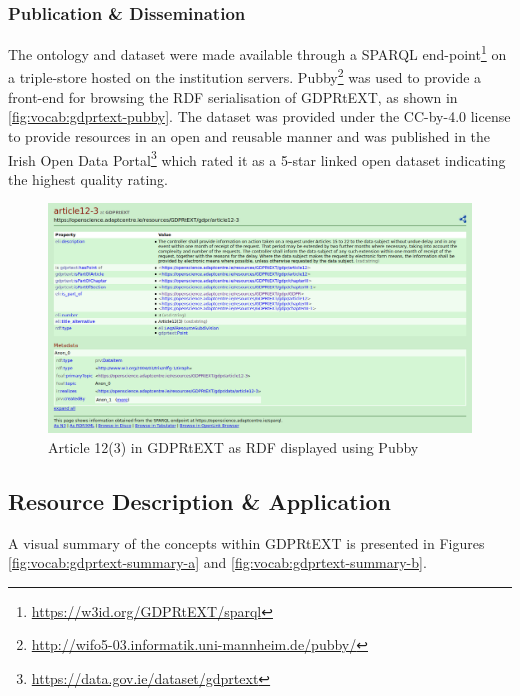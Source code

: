 \subsubsection{Publication \& Dissemination}
The ontology and dataset were made available through a SPARQL end-point\footnote{\url{https://w3id.org/GDPRtEXT/sparql}} on a triple-store hosted on the institution servers. Pubby\footnote{\url{http://wifo5-03.informatik.uni-mannheim.de/pubby/}} was used to provide a front-end for browsing the RDF serialisation of GDPRtEXT, as shown in \autoref{fig:vocab:gdprtext-pubby}. The dataset was provided under the CC-by-4.0 license to provide resources in an open and reusable manner and was published in the Irish Open Data Portal\footnote{\url{https://data.gov.ie/dataset/gdprtext}} which rated it as a 5-star linked open dataset indicating the highest quality rating. \begin{figure}[htbp]
    \centering
    \includegraphics[width=\linewidth]{img/gdprtext-pubby}
    \caption{Article 12(3) in GDPRtEXT as RDF displayed using Pubby \cite{pandit_gdprtext_2018}}
    \label{fig:vocab:gdprtext-pubby}
\end{figure}

\subsection{Resource Description \& Application}
A visual summary of the concepts within GDPRtEXT is presented in Figures \ref{fig:vocab:gdprtext-summary-a} and \ref{fig:vocab:gdprtext-summary-b}.

